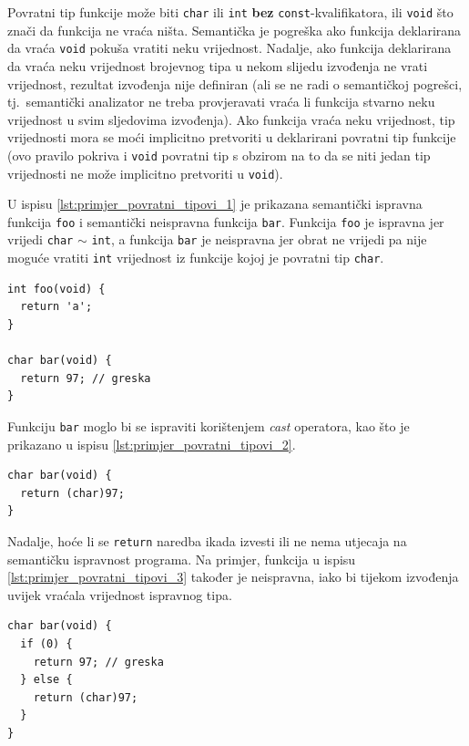 \documentclass[times, 12pt, utf8]{book}
\begin{document}
Povratni tip funkcije može biti \verb|char| ili \verb|int| \textbf{bez} \verb|const|-kvalifikatora, ili \verb|void| što znači da funkcija ne vraća ništa.
Semantička je pogreška ako funkcija deklarirana da vraća \verb|void| pokuša vratiti neku vrijednost.
Nadalje, ako funkcija deklarirana da vraća neku vrijednost brojevnog tipa u nekom slijedu izvođenja ne vrati vrijednost, rezultat izvođenja nije definiran (ali se ne radi o semantičkoj pogrešci, tj.~semantički analizator ne treba provjeravati vraća li funkcija stvarno neku vrijednost u svim sljedovima izvođenja).
Ako funkcija vraća neku vrijednost, tip vrijednosti mora se moći implicitno pretvoriti u deklarirani povratni tip funkcije (ovo pravilo pokriva i \verb|void| povratni tip s obzirom na to da se niti jedan tip vrijednosti ne može implicitno pretvoriti u \verb|void|).

U ispisu \ref{lst:primjer_povratni_tipovi_1} je prikazana semantički ispravna funkcija \verb|foo| i semantički neispravna funkcija \verb|bar|.
Funkcija \verb|foo| je ispravna jer vrijedi \verb|char| \(\sim\) \verb|int|, a funkcija \verb|bar| je neispravna jer obrat ne vrijedi pa nije moguće vratiti \verb|int| vrijednost iz funkcije kojoj je povratni tip \verb|char|.

\begin{lstlisting}[caption={Ispravna funkcija \texttt{foo} i neispravna funkcija \texttt{bar}.},label=lst:primjer_povratni_tipovi_1]
int foo(void) {
  return 'a';
}

char bar(void) {
  return 97; // greska
}
\end{lstlisting}

Funkciju \verb|bar| moglo bi se ispraviti korištenjem \emph{cast} operatora, kao što je prikazano u ispisu \ref{lst:primjer_povratni_tipovi_2}.

\begin{lstlisting}[caption={Ispravljena funkcija \texttt{bar}.},label=lst:primjer_povratni_tipovi_2]
char bar(void) {
  return (char)97;
}
\end{lstlisting}

Nadalje, hoće li se \verb|return| naredba ikada izvesti ili ne nema utjecaja na semantičku ispravnost programa.
Na primjer, funkcija u ispisu \ref{lst:primjer_povratni_tipovi_3} također je neispravna, iako bi tijekom izvođenja uvijek vraćala vrijednost ispravnog tipa.

\begin{lstlisting}[caption={Ispravnost tipova povratnih vrijednosti ne ovisi o tome hoće li se određena \texttt{return} naredba ikada izvršiti ili ne.},label=lst:primjer_povratni_tipovi_3]
char bar(void) {
  if (0) {
    return 97; // greska
  } else {
    return (char)97;
  }
}
\end{lstlisting}
\end{document}
